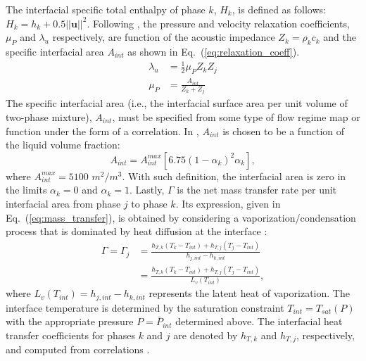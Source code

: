 \documentclass[preprint,10pt]{elsarticle}
\newcommand{\mbold}[1]{\boldsymbol#1}
\newcommand{\eqt}[1]{Eq.~(\ref{#1})}                     %
\begin{document}
%
The interfacial specific total enthalpy of phase $k$, $H_{k}$, is defined as follows: $H_k = h_k + 0.5 || \mbold u ||^2$. Following \cite{SEM}, the pressure and velocity relaxation coefficients, $\mu_P$  and $\lambda_u$ respectively, are function of the acoustic impedance $Z_k = \rho_k c_k$ and the specific interfacial area $A_{int}$ as shown in \eqt{eq:relaxation_coeff}.
%
\begin{subequations}
\label{eq:relaxation_coeff}
\begin{align}
  \label{E-R:85}
  \lambda_u &= \frac{1}{2} \mu_P Z_{k} Z_{j}
  \\
  \label{E-R:86}
  \mu_P &= \frac{A_{int}}{Z_{k}+Z_{j}}
\end{align}
\end{subequations}
%
The specific interfacial area (i.e., the interfacial surface area per unit
volume of two-phase mixture), $A_{int}$, must be specified from some type of
flow regime map or function under the form of a correlation. In \cite{SEM}, $A_{int}$ is chosen to be a function of the liquid volume fraction:
%
\begin{equation}\label{eq:Aint-sect4}
A_{int} = A_{int}^{max} \left[ 6.75 \left(1-\alpha_{k} \right)^2 \alpha_{k} \right],
\end{equation}
% 
where $A_{int}^{max} = 5100$ $m^2 / m^3$. With such definition, the interfacial area is zero in the limits $\alpha_{k} = 0$ and $\alpha_{k} = 1$. Lastly, $\Gamma$ is the net mass transfer rate per unit interfacial area from phase $j$ to phase $k$. Its expression, given in \eqt{eq:mass_transfer}, is obtained by considering a vaporization/condensation process that is dominated by heat diffusion at the interface \cite{SEM, BerryMarco_2014}:
%
\begin{align} \label{eq:mass_transfer}
  \nonumber
  \Gamma = \Gamma_{j}
  &= \frac{h_{T,  k} \left( T_{k} - T_{int} \right) + h_{T,  j} \left( T_{j} - T_{int} \right)}{h_{j,  int} - h_{k,  int}}
  \\
  &= \frac{h_{T,  k} \left( T_{k} - T_{int} \right) + h_{T,  j} \left( T_{j} - T_{int} \right)}{L_v \left( T_{int} \right)} ,
\end{align}
%
where $L_v \left( T_{int} \right) = h_{j,  int} - h_{k,  int}$
represents the latent heat of vaporization.  The interface
temperature is determined by the saturation constraint
$T_{int}=T_{sat}(P)$ with the appropriate pressure $P=\bar{P}_{int}$
determined above. The interfacial heat transfer coefficients for phases $k$ and $j$ are denoted by $h_{T,  k}$ and $h_{T,  j}$, respectively, and computed from correlations \cite{SEM}. 
\end{document}
